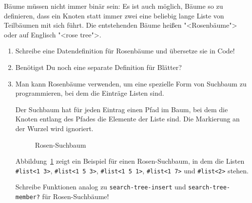 \begin{aufgabe}
  Bäume müssen nicht immer binär sein: Es ist auch möglich, Bäume so
  zu definieren, dass ein Knoten statt immer zwei eine beliebig lange
  Liste von Teilbäumen mit sich führt.  Die entstehenden Bäume heißen
  "<Rosenbäume"> oder auf Englisch "<rose tree">.

  \begin{enumerate}
  \item Schreibe eine Datendefinition für Rosenbäume und übersetze sie
    in Code!
  \item Benötigst Du noch eine separate Definition für Blätter?
  \item Man kann Rosenbäume verwenden, um eine spezielle Form von
    Suchbaum zu programmieren, bei dem die Einträge Listen sind.

    Der Suchbaum hat für jeden Eintrag einen Pfad im Baum, bei dem die
    Knoten entlang des Pfades die Elemente der Liste sind.  Die
    Markierung an der Wurzel wird ignoriert.

    \begin{figure}[tbh]
      \centering
{}
      
      \caption{Rosen-Suchbaum}
      \label{fig:rose-search-tree}
    \end{figure}

    Abbildung~\ref{fig:rose-search-tree} zeigt ein Beispiel für einen
    Rosen-Suchbaum, in dem die Listen \lstinline{#list<1 3>},
    \lstinline{#list<1 5 3>}, \lstinline{#list<1 5 1>},
    \lstinline{#list<1 7>} und \lstinline{#list<2>} stehen.

    Schreibe Funktionen analog zu \lstinline{search-tree-insert} und
    \lstinline{search-tree-member?} für Rosen-Suchbäume!
  \end{enumerate}
\end{aufgabe}

